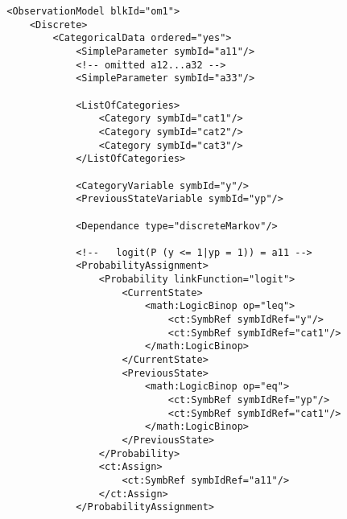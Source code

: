 \lstset{language=XML}
\begin{lstlisting}
        <ObservationModel blkId="om1">
            <Discrete>
                <CategoricalData ordered="yes">
                    <SimpleParameter symbId="a11"/>
                    <!-- omitted a12...a32 -->
                    <SimpleParameter symbId="a33"/>
                    
                    <ListOfCategories> 
                        <Category symbId="cat1"/>
                        <Category symbId="cat2"/>
                        <Category symbId="cat3"/>
                    </ListOfCategories>
                    
                    <CategoryVariable symbId="y"/>
                    <PreviousStateVariable symbId="yp"/>
                    
                    <Dependance type="discreteMarkov"/>
                    
                    <!--   logit(P (y <= 1|yp = 1)) = a11 -->
                    <ProbabilityAssignment>
                        <Probability linkFunction="logit">
                            <CurrentState>
                                <math:LogicBinop op="leq">
                                    <ct:SymbRef symbIdRef="y"/>
                                    <ct:SymbRef symbIdRef="cat1"/>
                                </math:LogicBinop>
                            </CurrentState>
                            <PreviousState>
                                <math:LogicBinop op="eq">
                                    <ct:SymbRef symbIdRef="yp"/>
                                    <ct:SymbRef symbIdRef="cat1"/>
                                </math:LogicBinop>
                            </PreviousState>
                        </Probability>
                        <ct:Assign>
                            <ct:SymbRef symbIdRef="a11"/>
                        </ct:Assign>
                    </ProbabilityAssignment>
                    

\end{lstlisting}
